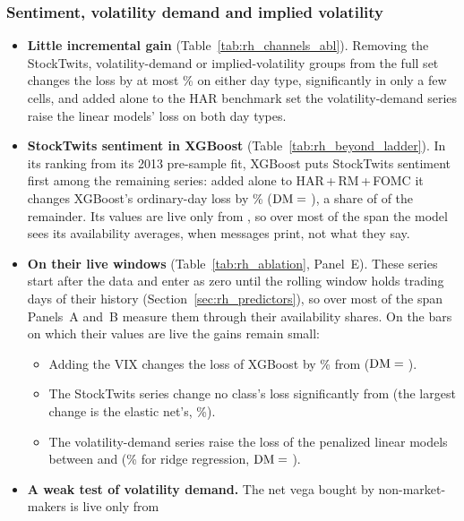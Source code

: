 \subsubsection{Sentiment, volatility demand and implied volatility}
\label{sec:rh_fi_alt}
\begin{itemize}
\item \textbf{Little incremental gain} (Table~\ref{tab:rh_channels_abl}). Removing the StockTwits, volatility-demand
  or implied-volatility groups from the full set changes the loss by at most \rhchAltLoMaxAbs\% on either day type,
  significantly in only a few cells, and added alone to the HAR benchmark set the volatility-demand series raise the
  linear models' loss on both day types.
\item \textbf{StockTwits sentiment in XGBoost} (Table~\ref{tab:rh_beyond_ladder}). In its ranking from its 2013
  pre-sample fit, XGBoost puts StockTwits sentiment first among the remaining series: added alone to HAR\,+\,RM\,+\,FOMC it changes XGBoost's ordinary-day
  loss by \rhbyLXgbKOneOrdPct\% ($\mathrm{DM}={}$\rhbyLXgbKOneOrdDm), a share of \rhbyLXgbKOneOrdR{} of the remainder. Its
  values are live only from \rhabLiveSentStart, so over most of the span the model sees its availability averages,
  when messages print, not what they say.
\item \textbf{On their live windows} (Table~\ref{tab:rh_ablation}, Panel~E). These series start after the data and
  enter as zero until the rolling window holds \rhorWindowDays{} trading days of their history
  (Section~\ref{sec:rh_predictors}), so over most of the span Panels~A and~B measure them through their availability
  shares. On the bars on which their values are live the gains remain small:
  \begin{itemize}
  \item Adding the VIX changes the loss of XGBoost by \rhabXgbAddIvLiveIvPct\% from \rhabLiveIvStart{}
    ($\mathrm{DM}={}$\rhabXgbAddIvLiveIvDm).
  \item The StockTwits series change no class's loss significantly from \rhabLiveSentStart{} (the largest change is
    the elastic net's, \rhabEnetAddSentLiveSentPct\%).
  \item The volatility-demand series raise the loss of the penalized linear models between \rhabLiveVdStart{} and
    \rhabLiveVdEnd{} (\rhabRidgeAddVdLiveVdPct\% for ridge regression, $\mathrm{DM}={}$\rhabRidgeAddVdLiveVdDm).
  \end{itemize}
\item \textbf{A weak test of volatility demand.} The net vega bought by non-market-makers is live only from

\end{itemize}
